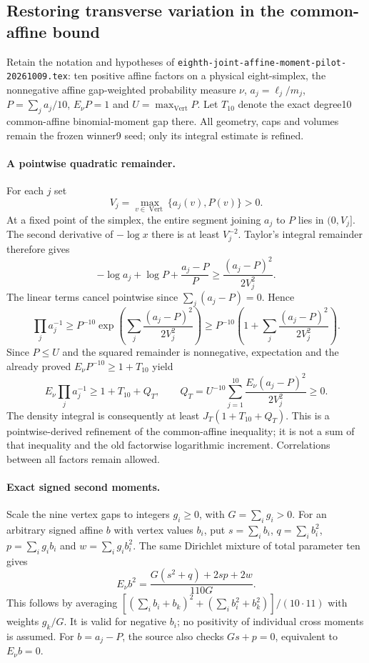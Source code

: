 \subsection{Restoring transverse variation in the common-affine bound}
\label{sec:eighth-joint-affine-curvature-20261009}

Retain the notation and hypotheses of
\texttt{eighth-joint-affine-moment-pilot-20261009.tex}:
ten positive affine factors on a physical eight-simplex, the
nonnegative affine gap-weighted probability measure $\nu$,
$a_j=\ell_j/m_j$, $P=\sum_ja_j/10$, $E_\nu P=1$ and
$U=\max_{\operatorname{Vert}}P$. Let $T_{10}$ denote the exact degree10
common-affine binomial-moment gap there. All geometry, caps and volumes
remain the frozen winner9 seed; only its integral estimate is refined.

\paragraph{A pointwise quadratic remainder.}
For each $j$ set
\[
 V_j=\max_{v\in\operatorname{Vert}}\{a_j(v),P(v)\}>0.
\]
At a fixed point of the simplex, the entire segment joining $a_j$ to
$P$ lies in $(0,V_j]$. The second derivative of $-\log x$ there is
at least $V_j^{-2}$. Taylor's integral remainder therefore gives
\[
 -\log a_j+\log P+\frac{a_j-P}{P}
 \ge\frac{(a_j-P)^2}{2V_j^2}.
\]
The linear terms cancel pointwise since $\sum_j(a_j-P)=0$. Hence
\[
 \prod_j a_j^{-1}
 \ge P^{-10}\exp\!\left(\sum_j\frac{(a_j-P)^2}{2V_j^2}\right)
 \ge P^{-10}\left(1+\sum_j\frac{(a_j-P)^2}{2V_j^2}\right).
\]
Since $P\le U$ and the squared remainder is nonnegative, expectation
and the already proved $E_\nu P^{-10}\ge1+T_{10}$ yield
\[
 E_\nu\prod_ja_j^{-1}\ge1+T_{10}+Q_T,
 \qquad
 Q_T=U^{-10}\sum_{j=1}^{10}
          \frac{E_\nu(a_j-P)^2}{2V_j^2}\ge0.
 \tag{C}
\]
The density integral is consequently at least $J_T(1+T_{10}+Q_T)$.
This is a pointwise-derived refinement of the common-affine inequality;
it is not a sum of that inequality and the old factorwise logarithmic
increment. Correlations between all factors remain allowed.

\paragraph{Exact signed second moments.}
Scale the nine vertex gaps to integers $g_i\ge0$, with
$G=\sum_i g_i>0$. For an arbitrary signed affine $b$ with vertex
values $b_i$, put $s=\sum_i b_i$, $q=\sum_i b_i^2$,
$p=\sum_i g_i b_i$ and $w=\sum_i g_i b_i^2$. The same
Dirichlet mixture of total parameter ten gives
\[
 E_\nu b^2=\frac{G(s^2+q)+2sp+2w}{110G}.
 \tag{D2}
\]
This follows by averaging
$[(\sum_i b_i+b_k)^2+(\sum_i b_i^2+b_k^2)]/(10\cdot11)$
with weights $g_k/G$. It is valid for negative $b_i$; no positivity
of individual cross moments is assumed. For $b=a_j-P$, the source
also checks $Gs+p=0$, equivalent to $E_\nu b=0$.


